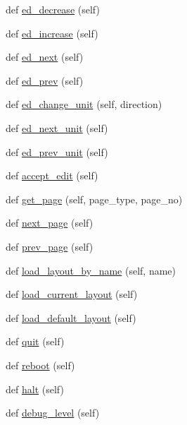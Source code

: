 \begin{DoxyCompactItemize}
\item 
def \hyperlink{classlayout_1_1layout_a869abc577f8835970f78775496638c3a}{ed\+\_\+decrease} (self)
\item 
def \hyperlink{classlayout_1_1layout_a998414989210d42a9132236290d8e7a7}{ed\+\_\+increase} (self)
\item 
def \hyperlink{classlayout_1_1layout_a15504939ad10f87020d0910fd7374bed}{ed\+\_\+next} (self)
\item 
def \hyperlink{classlayout_1_1layout_a806ed3d52003228e1c7bcc0047287040}{ed\+\_\+prev} (self)
\item 
def \hyperlink{classlayout_1_1layout_a8d3ec5f26da1b5e2fd4587ebddd76c83}{ed\+\_\+change\+\_\+unit} (self, direction)
\item 
def \hyperlink{classlayout_1_1layout_ae0141cdca0be7dd22e9da7b2464cc317}{ed\+\_\+next\+\_\+unit} (self)
\item 
def \hyperlink{classlayout_1_1layout_a1ebfb6c0f86169a4cc4a5fce54533f9c}{ed\+\_\+prev\+\_\+unit} (self)
\item 
def \hyperlink{classlayout_1_1layout_aadca21149875e45fbb0296dd7f20e7c5}{accept\+\_\+edit} (self)
\item 
def \hyperlink{classlayout_1_1layout_afb35c9f363f82940357e512c2e8da4ce}{get\+\_\+page} (self, page\+\_\+type, page\+\_\+no)
\item 
def \hyperlink{classlayout_1_1layout_a6c2fd6be83cae3597b4ebe6f9c311217}{next\+\_\+page} (self)
\item 
def \hyperlink{classlayout_1_1layout_a2a84004ae84bcf89e33faf6fb9fd5ddc}{prev\+\_\+page} (self)
\item 
def \hyperlink{classlayout_1_1layout_a2829719adca767c425e1f6250198e2ea}{load\+\_\+layout\+\_\+by\+\_\+name} (self, name)
\item 
def \hyperlink{classlayout_1_1layout_acd974259d2135316a557ff7f4400141f}{load\+\_\+current\+\_\+layout} (self)
\item 
def \hyperlink{classlayout_1_1layout_a431f05998b17b8c26b78b40cee4ac8f0}{load\+\_\+default\+\_\+layout} (self)
\item 
def \hyperlink{classlayout_1_1layout_a919675f9c2c0b6dd9c1bd3e1310a2ab3}{quit} (self)
\item 
def \hyperlink{classlayout_1_1layout_a29b0ea3c979e6254436eb91dd4e92bc5}{reboot} (self)
\item 
def \hyperlink{classlayout_1_1layout_ab3d0775d4a7f40e99f97839bb8e04692}{halt} (self)
\item 
def \hyperlink{classlayout_1_1layout_a0f2bebab606bc3a5b8d8556efe9a3769}{debug\+\_\+level} (self)
\end{DoxyCompactItemize}
